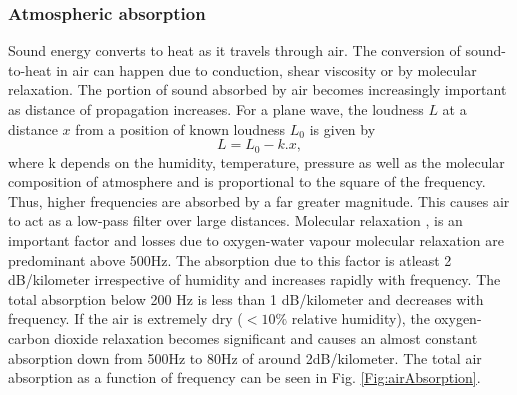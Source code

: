 \subsubsection{Atmospheric absorption}
Sound energy converts to heat as it travels through air. The conversion of sound-to-heat in air can happen due to conduction, shear viscosity or by molecular relaxation. The portion of sound absorbed by air becomes increasingly important as distance of propagation increases. For a plane wave, the loudness $L$ at a distance $x$ from a position of known loudness $L_0$ is given by
\begin{equation}
    L= L_0 - k.x,
\end{equation}
where k depends on the humidity, temperature, pressure as well as the molecular composition of atmosphere and is proportional to the square of the frequency. Thus, higher frequencies are absorbed by a far greater magnitude. This causes air to act as a low-pass filter over large distances. Molecular relaxation \cite{bass1990atmospheric}, \cite{evans1972atmospheric} is an important factor and losses due to oxygen-water vapour molecular relaxation are predominant above 500Hz. The absorption due to this factor is atleast 2 dB/kilometer irrespective of humidity and increases rapidly with frequency. The total absorption below 200 Hz is less than 1 dB/kilometer and decreases with frequency. If the air is extremely dry ($< 10\%$ relative humidity), the oxygen-carbon dioxide relaxation becomes significant and causes an almost constant absorption down from 500Hz to 80Hz of around 2dB/kilometer. The total air absorption as a function of frequency can be seen in Fig. \ref{Fig:airAbsorption}.


